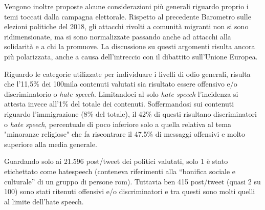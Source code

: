 Vengono inoltre proposte alcune considerazioni più generali riguardo proprio i temi toccati dalla campagna elettorale. Rispetto al precedente Barometro sulle elezioni politiche del 2018, gli attacchi rivolti a comunità migranti non si sono ridimensionate, ma si sono normalizzate passando anche ad attacchi alla solidarità e a chi la promuove. La discussione su questi argomenti risulta ancora più polarizzata, anche a causa dell'intreccio con il dibattito sull'Unione Europea.

Riguardo le categorie utilizzate per individuare i livelli di odio generali, risulta che l'11,5\% dei 100mila contenuti valutati sia risultato essere offensivo e/o discriminatorio o \textit{hate speech}. Limitandoci al solo \textit{hate speech} l'incidenza si attesta invece all'1\% del totale dei contenuti. Soffermandosi sui contenuti riguardo l'immigrazione (8\% del totale), il 42\% di questi risultano discriminatori o \textit{hate speech}, percentuale di poco inferiore solo a quella relativa al tema "minoranze religiose" che fa riscontrare il 47.5\% di messaggi offensivi e molto superiore alla media generale. 

Guardando solo ai 21.596 post/tweet dei politici valutati, solo 1 è stato etichettato come hatespeech (conteneva riferimenti alla “bonifica sociale e culturale” di un gruppo di persone rom). Tuttavia ben 415 post/tweet (quasi 2 su 100) sono stati ritenuti offensivi e/o discriminatori e tra questi sono molti quelli al limite dell’hate speech.


